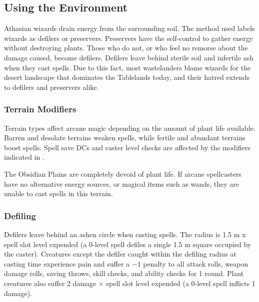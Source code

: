 \subsection{Using the Environment}
Athasian wizards drain energy from the surrounding soil. The method used labels wizards as defilers or preservers. Preservers have the self-control to gather energy without destroying plants. Those who do not, or who feel no remorse about the damage caused, become defilers. Defilers leave behind sterile soil and infertile ash when they cast spells. Due to this fact, most wastelanders blame wizards for the desert landscape that dominates the Tablelands today, and their hatred extends to defilers and preservers alike.

\subsubsection{Terrain Modifiers}
Terrain types affect arcane magic depending on the amount of plant life available. Barren and desolate terrains weaken spells, while fertile and abundant terrains boost spells. Spell save DCs and caster level checks are affected by the modifiers indicated in .

The Obsidian Plains are completely devoid of plant life. If arcane spellcasters have no alternative energy sources, or magical items such as wands, they are unable to cast spells in this terrain.


\subsubsection{Defiling}
Defilers leave behind an ashen circle when casting spells. The radius is 1.5 m x spell slot level expended (a 0-level spell defiles a single 1.5 m square occupied by the caster). Creatures except the defiler caught within the defiling radius at casting time experience pain and suffer a $-1$ penalty to all attack rolls, weapon damage rolls, saving throws, skill checks, and ability checks for 1 round. Plant creatures also suffer 2 damage $\times$ spell slot level expended (a 0-level spell inflicts 1 damage).

